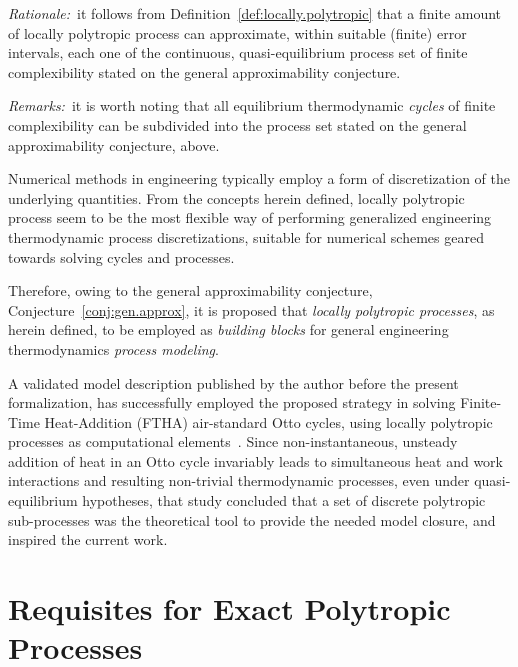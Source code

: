 \documentclass[fleqn,11pt]{SelfArx}
\begin{document}
    \noindent\textit{Rationale:\/}~it follows from Definition~\ref{def:locally.polytropic}  that
    a finite amount of locally polytropic process  can  approximate,  within  suitable  (finite)
    error intervals, each one  of  the  continuous,  quasi-equilibrium  process  set  of  finite
    complexibility stated on the general approximability conjecture.\vspace{1ex}

    \noindent\textit{Remarks:\/}~it  is  worth  noting  that   all   equilibrium   thermodynamic
    \emph{cycles} of finite complexibility can be subdivided into the process set stated on  the
    general approximability conjecture, above.

    Numerical methods in engineering typically employ a form of discretization of the underlying
    quantities. From the concepts herein defined, locally polytropic process seem to be the most
    flexible way of performing generalized engineering  thermodynamic  process  discretizations,
    suitable for numerical schemes geared towards solving cycles and processes.

    Therefore,      owing      to      the       general       approximability       conjecture,
    Conjecture~\ref{conj:gen.approx}, it is proposed that \emph{locally  polytropic  processes},
    as herein defined,  to  be  employed  as  \emph{building  blocks}  for  general  engineering
    thermodynamics \emph{process modeling}.

    A validated model description published by the author before the present formalization,  has
    successfully employed the proposed strategy  in  solving  Finite-Time  Heat-Addition  (FTHA)
    air-standard  Otto   cycles,   using   locally   polytropic   processes   as   computational
    elements~\cite{2017-NaaktgeborenC-IntJMechEngEduc}.   Since   non-instantaneous,    unsteady
    addition of  heat  in  an  Otto  cycle  invariably  leads  to  simultaneous  heat  and  work
    interactions and resulting non-trivial thermodynamic processes, even under quasi-equilibrium
    hypotheses, that study concluded that a set of discrete  polytropic  sub-processes  was  the
    theoretical tool to provide the needed model closure, and inspired the current work.

\section{Requisites for Exact Polytropic Processes}
\end{document}
